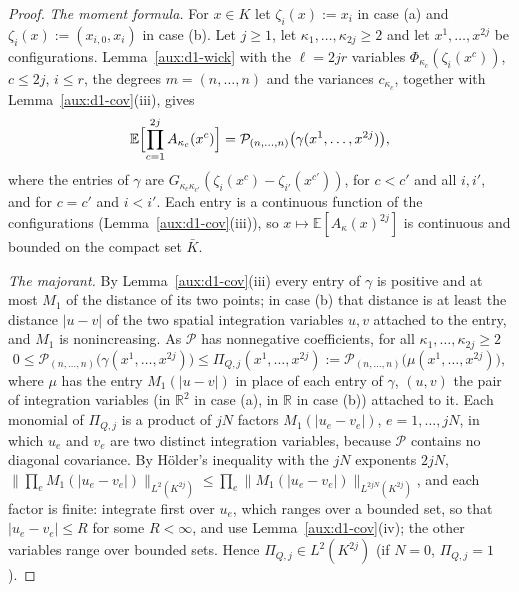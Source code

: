 \documentclass[11pt,a4paper]{article}
\theoremstyle{plain}
\theoremstyle{definition}
\theoremstyle{plain}
\theoremstyle{definition}
\newcommand{\R}{\mathbb{R}}
\newcommand{\E}{\mathbb{E}}
\begin{document}
\begin{proof}
\emph{The moment formula.} For $x\in K$ let $\zeta_i(x):=x_i$ in case (a) and
$\zeta_i(x):=(x_{i,0},x_i)$ in case (b). Let $j\ge1$, let $\kappa_1,\dots,\kappa_{2j}\ge2$ and
let $x^1,\dots,x^{2j}$ be configurations. Lemma~\ref{aux:d1-wick} with the $\ell=2jr$ variables
$\Phi_{\kappa_c}(\zeta_i(x^c))$, $c\le2j$, $i\le r$, the degrees $m=(n,\dots,n)$ and the
variances $c_{\kappa_c}$, together with Lemma~\ref{aux:d1-cov}(iii), gives
\begin{equation}\label{eq:d1-two}
 \E\Bigl[\prod_{c=1}^{2j}A_{\kappa_c}(x^c)\Bigr]
 =\mathcal P_{(n,\dots,n)}\bigl(\gamma(x^1,\dots,x^{2j})\bigr),
\end{equation}
where the entries of $\gamma$ are $G_{\kappa_c\kappa_{c'}}(\zeta_i(x^c)-\zeta_{i'}(x^{c'}))$,
for $c<c'$ and all $i,i'$, and for $c=c'$ and $i<i'$. Each entry is a continuous function of
the configurations (Lemma~\ref{aux:d1-cov}(iii)), so
$x\mapsto\E[A_\kappa(x)^{2j}]$ is continuous and bounded on the compact set $\bar K$.

\emph{The majorant.} By Lemma~\ref{aux:d1-cov}(iii) every entry of $\gamma$ is positive and
at most $M_1$ of the distance of its two points; in case (b) that distance is at least the
distance $|u-v|$ of the two spatial integration variables $u,v$ attached to the entry, and
$M_1$ is nonincreasing. As $\mathcal P$ has nonnegative coefficients, for all
$\kappa_1,\dots,\kappa_{2j}\ge2$
\begin{equation}\label{eq:d1-major}
 0\le\mathcal P_{(n,\dots,n)}\bigl(\gamma(x^1,\dots,x^{2j})\bigr)\le
 \Pi_{Q,j}(x^1,\dots,x^{2j}):=\mathcal P_{(n,\dots,n)}\bigl(\mu(x^1,\dots,x^{2j})\bigr),
\end{equation}
where $\mu$ has the entry $M_1(|u-v|)$ in place of each entry of $\gamma$, $(u,v)$ the pair of
integration variables (in $\R^2$ in case (a), in $\R$ in case (b)) attached to it. Each
monomial of $\Pi_{Q,j}$ is a product of $jN$ factors $M_1(|u_e-v_e|)$, $e=1,\dots,jN$, in which
$u_e$ and $v_e$ are two distinct integration variables, because $\mathcal P$ contains no
diagonal covariance. By H\"older's inequality with the $jN$ exponents $2jN$,
$\|\prod_eM_1(|u_e-v_e|)\|_{L^2(K^{2j})}\le\prod_e\|M_1(|u_e-v_e|)\|_{L^{2jN}(K^{2j})}$, and each
factor is finite: integrate first over $u_e$, which ranges over a bounded set, so that
$|u_e-v_e|\le R$ for some $R<\infty$, and use Lemma~\ref{aux:d1-cov}(iv); the other variables
range over bounded sets. Hence $\Pi_{Q,j}\in L^2(K^{2j})$ (if $N=0$, $\Pi_{Q,j}=1$).


\end{proof}
\end{document}
